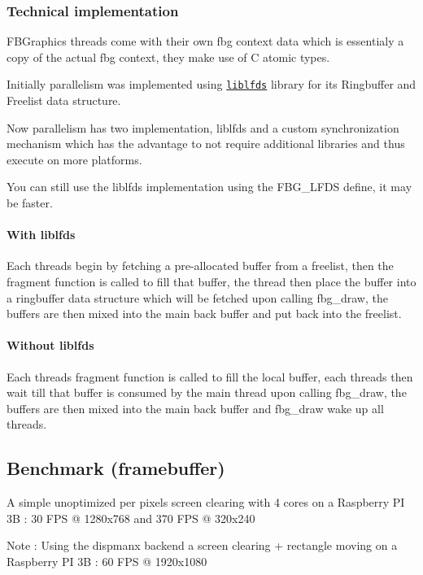 \subsubsection*{Technical implementation}

F\+B\+Graphics threads come with their own fbg context data which is essentialy a copy of the actual fbg context, they make use of C atomic types.

Initially parallelism was implemented using \href{http://liblfds.org/}{\tt liblfds} library for its Ringbuffer and Freelist data structure.

Now parallelism has two implementation, liblfds and a custom synchronization mechanism which has the advantage to not require additional libraries and thus execute on more platforms.

You can still use the liblfds implementation using the {\ttfamily F\+B\+G\+\_\+\+L\+F\+DS} define, it may be faster.

\paragraph*{With liblfds}

Each threads begin by fetching a pre-\/allocated buffer from a freelist, then the fragment function is called to fill that buffer, the thread then place the buffer into a ringbuffer data structure which will be fetched upon calling {\ttfamily fbg\+\_\+draw}, the buffers are then mixed into the main back buffer and put back into the freelist.

\paragraph*{Without liblfds}

Each threads fragment function is called to fill the local buffer, each threads then wait till that buffer is consumed by the main thread upon calling {\ttfamily fbg\+\_\+draw}, the buffers are then mixed into the main back buffer and {\ttfamily fbg\+\_\+draw} wake up all threads.

\subsection*{Benchmark (framebuffer)}

A simple unoptimized per pixels screen clearing with 4 cores on a Raspberry PI 3B \+: 30 F\+PS @ 1280x768 and 370 F\+PS @ 320x240

Note \+: Using the dispmanx backend a screen clearing + rectangle moving on a Raspberry PI 3B \+: 60 F\+PS @ 1920x1080

